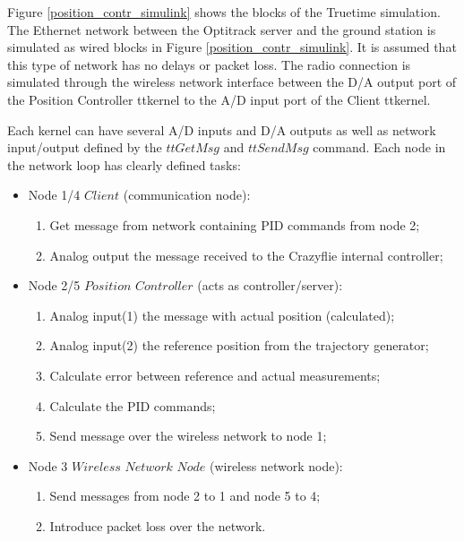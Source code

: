 
Figure \ref{position_contr_simulink} shows the blocks of the Truetime simulation. The Ethernet network between the Optitrack server and the ground station is simulated as wired blocks in Figure \ref{position_contr_simulink}. It is assumed that this type of network has no delays or packet loss. The radio connection is simulated through the wireless network interface between the D/A output port of the Position Controller ttkernel to the A/D input port of the Client ttkernel.

Each kernel can have several A/D inputs and D/A outputs as well as network input/output defined by the $ttGetMsg$ and $ttSendMsg$ command. Each node in the network loop has clearly defined tasks:

\begin{itemize}
    \item Node 1/4 $Client$ (communication node):
    \begin{enumerate}
        \item Get message from network containing PID commands from node 2;
        \item Analog output the message received to the Crazyflie internal controller;
    \end{enumerate}
    \item Node 2/5 $Position$ $Controller$ (acts as controller/server):
    \begin{enumerate}
        \item Analog input(1) the message with actual position (calculated);
        \item Analog input(2) the reference position from the trajectory generator;
        \item Calculate error between reference and actual measurements;
        \item Calculate the PID commands;
        \item Send message over the wireless network to node 1;
    \end{enumerate}
    \item Node 3 $Wireless$ $Network$ $Node$ (wireless network node):
    \begin{enumerate}
        \item Send messages from node 2 to 1 and node 5 to 4;
        \item Introduce packet loss over the network.
    \end{enumerate}
\end{itemize}

